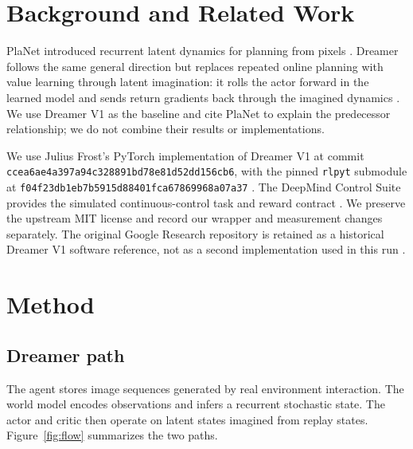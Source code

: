 \documentclass{article}
\begin{document}
\section{Background and Related Work}

PlaNet introduced recurrent latent dynamics for planning from pixels \citep{hafner2019latent}. Dreamer follows the same general direction but replaces repeated online planning with value learning through latent imagination: it rolls the actor forward in the learned model and sends return gradients back through the imagined dynamics \citep{hafner2020dream}. We use Dreamer V1 as the baseline and cite PlaNet to explain the predecessor relationship; we do not combine their results or implementations.

We use Julius Frost's PyTorch implementation of Dreamer V1 at commit \texttt{ccea6ae4a397a94c328891bd78e81d52dd156cb6}, with the pinned \texttt{rlpyt} submodule at \texttt{f04f23db1eb7b5915d88401fca67869968a07a37} \citep{frost_dreamer_pytorch}. The DeepMind Control Suite provides the simulated continuous-control task and reward contract \citep{tassa2018dmcontrol}. We preserve the upstream MIT license and record our wrapper and measurement changes separately.
The original Google Research repository is retained as a historical Dreamer V1 software reference, not as a second implementation used in this run \citep{google_research_dreamer}.

\section{Method}

\subsection{Dreamer path}

The agent stores image sequences generated by real environment interaction. The world model encodes observations and infers a recurrent stochastic state. The actor and critic then operate on latent states imagined from replay states. Figure~\ref{fig:flow} summarizes the two paths.
\end{document}

